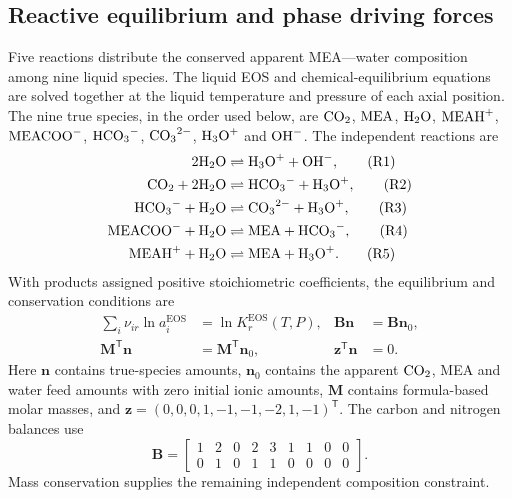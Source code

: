 \subsection{Reactive equilibrium and phase driving forces}\label{subsec:thermodynamics}
Five reactions distribute the conserved apparent MEA--\COtwo--water composition among nine liquid species.
The liquid EOS and chemical-equilibrium equations are solved together at the liquid temperature and pressure of each axial position.
The nine true species, in the order used below, are \(\COtwo\), \(\MEA\), \(\HtwoO\), \(\MEAH\), \(\MEACOO\), \(\HCOthree\), \(\ce{CO3^{2-}}\), \(\ce{H3O+}\) and \(\ce{OH-}\).
The independent reactions are
\begin{align}
2\HtwoO &\rightleftharpoons \ce{H3O+}+\ce{OH-}, \tag{R1}\label{eq:reactive-r1}\\
\COtwo+2\HtwoO &\rightleftharpoons \HCOthree+\ce{H3O+}, \tag{R2}\label{eq:reactive-r2}\\
\HCOthree+\HtwoO &\rightleftharpoons \ce{CO3^{2-}}+\ce{H3O+}, \tag{R3}\label{eq:reactive-r3}\\
\MEACOO+\HtwoO &\rightleftharpoons \MEA+\HCOthree, \tag{R4}\label{eq:reactive-r4}\\
\MEAH+\HtwoO &\rightleftharpoons \MEA+\ce{H3O+}. \tag{R5}\label{eq:reactive-r5}
\end{align}
With products assigned positive stoichiometric coefficients, the equilibrium and conservation conditions are
\begin{align}
\sum_i\nu_{ir}\ln a_i^{\mathrm{EOS}}&=\ln K_r^{\mathrm{EOS}}(T,P),&
\mathbf B\mathbf n&=\mathbf B\mathbf n_0,\\
\mathbf M^{\mathsf T}\mathbf n&=\mathbf M^{\mathsf T}\mathbf n_0,&
\mathbf z^{\mathsf T}\mathbf n&=0.
\end{align}
Here \(\mathbf n\) contains true-species amounts, \(\mathbf n_0\) contains the apparent \(\COtwo\), MEA and water feed amounts with zero initial ionic amounts, \(\mathbf M\) contains formula-based molar masses, and \(\mathbf z=(0,0,0,1,-1,-1,-2,1,-1)^{\mathsf T}\).
The carbon and nitrogen balances use
\begin{equation}
\mathbf B=
\begin{bmatrix}
1&2&0&2&3&1&1&0&0\\
0&1&0&1&1&0&0&0&0
\end{bmatrix}.
\end{equation}
Mass conservation supplies the remaining independent composition constraint.


